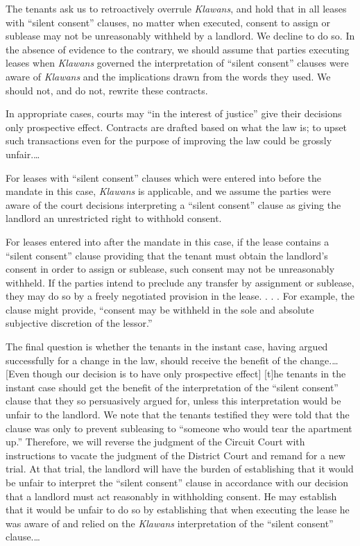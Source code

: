 
The tenants ask us to retroactively overrule \textit{Klawans}, and hold that in
all leases with ``silent consent'' clauses, no matter when executed, consent to
assign or sublease may not be unreasonably withheld by a landlord. We decline
to do so. In the absence of evidence to the contrary, we should assume that
parties executing leases when \textit{Klawans} governed the interpretation of
``silent consent'' clauses were aware of \textit{Klawans} and the implications
drawn from the words they used. We should not, and do not, rewrite these
contracts.

In appropriate cases, courts may ``in the interest of justice'' give their
decisions only prospective effect. Contracts are drafted based on what the law
is; to upset such transactions even for the purpose of improving the law could
be grossly unfair.\ldots

For leases with ``silent consent'' clauses which were entered into before the
mandate in this case, \textit{Klawans} is applicable, and we assume the parties
were aware of the court decisions interpreting a ``silent consent'' clause as
giving the landlord an unrestricted right to withhold consent.

For leases entered into after the mandate in this case, if the lease contains a
``silent consent'' clause providing that the tenant must obtain the landlord's
consent in order to assign or sublease, such consent may not be unreasonably
withheld. If the parties intend to preclude any transfer by assignment or
sublease, they may do so by a freely negotiated provision in the lease. . . .
For example, the clause might provide, ``consent may be withheld in the sole
and absolute subjective discretion of the lessor.''

The final question is whether the tenants in the instant case, having argued
successfully for a change in the law, should receive the benefit of the
change.\ldots
[Even though our decision is to have only prospective effect] [t]he
tenants in the instant case should get the benefit of the interpretation of the
``silent consent'' clause that they so persuasively argued for, unless this
interpretation would be unfair to the landlord. We note that the tenants
testified they were told that the clause was only to prevent subleasing to
``someone who would tear the apartment up.'' Therefore, we will reverse the
judgment of the Circuit Court with instructions to vacate the judgment of the
District Court and remand for a new trial. At that trial, the landlord will
have the burden of establishing that it would be unfair to interpret the
``silent consent'' clause in accordance with our decision that a landlord must
act reasonably in withholding consent. He may establish that it would be unfair
to do so by establishing that when executing the lease he was aware of and
relied on the \textit{Klawans} interpretation of the ``silent consent''
clause.\ldots

